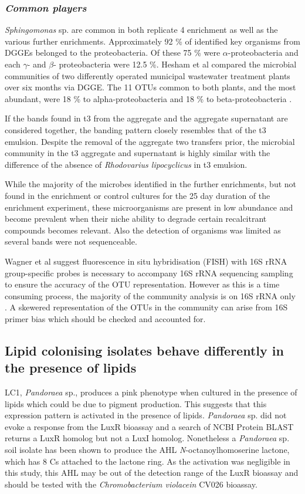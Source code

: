 \documentclass[11pt]{article}
\begin{document}
\subsubsection{\emph{Common players}}
\emph{Sphingomonas} sp. are common in both replicate 4 enrichment as well as the various further enrichments.
Approximately 92 \% of identified key organisms from DGGEs belonged to the proteobacteria. Of these 75 \% were \emph{$\alpha$}-proteobacteria  and each \emph{$\gamma$}- and \emph{$\beta$}- proteobacteria were 12.5 \%.
Hesham et al compared the microbial communities of two differently operated municipal wastewater treatment plants over six months via DGGE. The 11 OTUs common to both plants, and the most abundant, were 18 \% to alpha-proteobacteria and 18 \% to beta-proteobacteria \cite{Hesham_11}.

If the bands found in t3 from the aggregate and the aggregate supernatant are considered together, the banding pattern closely resembles that of the t3 emulsion. Despite the removal of the aggregate two transfers prior, the microbial community in the t3 aggregate and supernatant is highly similar with the difference of the absence of \emph{Rhodovarius lipocyclicus} in t3 emulsion.


While the majority of the microbes identified in the further enrichments, but not found in the enrichment or control cultures for the 25 day duration of the enrichment experiment, these microorganisms are present in low abundance and become prevalent when their niche ability to degrade certain recalcitrant compounds becomes relevant. Also the detection of organisms was limited as several bands were not sequenceable.

Wagner et al suggest fluorescence in situ hybridisation (FISH) with 16S rRNA  group-specific probes is necessary to accompany 16S rRNA sequencing sampling to ensure the accuracy of the OTU representation. However as this is a time consuming process, the majority of the community analysis is on 16S rRNA only \cite{Wagner_02} . A skewered representation of the OTUs in the community can arise from 16S primer bias which should be checked and accounted for.

\subsection{Lipid colonising isolates behave differently in the presence of lipids}

LC1, \emph{Pandoraea} sp., produces a pink phenotype when cultured in the presence of lipids which could be due to pigment production. This suggests that this expression pattern is activated in the presence of lipids. \emph{Pandoraea} sp. did not evoke a response from the LuxR bioassay and a search of NCBI Protein BLAST returns a LuxR homolog but not a LuxI homolog. Nonetheless a \emph{Pandoraea} sp. soil isolate has been shown to produce the AHL \emph{N}-octanoylhomoserine lactone, which has 8 Cs attached to the lactone ring. As the activation was negligible in this study, this AHL may be out of the detection range of the LuxR bioassay and should be tested with the \emph{Chromobacterium violacein} CV026 bioassay.
\end{document}
